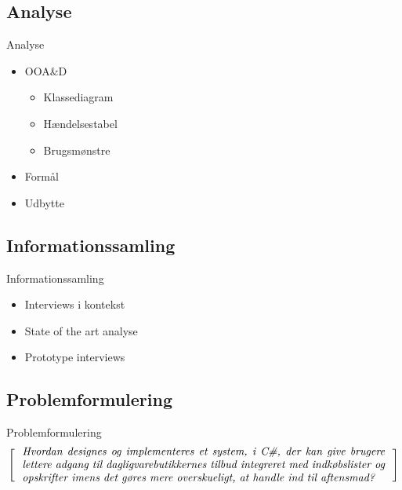 \subsection{Analyse}
\begin{frame}{Analyse}
\begin{itemize}
   \item OOA\&D
   \begin{itemize}
      \item Klassediagram
      \item Hændelsestabel
      \item Brugsmønstre
   \end{itemize}
   \item Formål %
   \item Udbytte %
\end{itemize}
\end{frame}

\subsection{Informationssamling}
\begin{frame}{Informationssamling}
\begin{itemize}
   \item Interviews i kontekst
   \item State of the art analyse
   \item Prototype interviews
\end{itemize}
\end{frame}

\subsection{Problemformulering}
\begin{frame}{Problemformulering}
\[
  \left[
  \begin{minipage}{\textwidth}
  \centering
  \begin{minipage}{0.96\textwidth}
  \textit{Hvordan designes og implementeres et system, i C\#, der kan give brugere lettere adgang til dagligvarebutikkernes tilbud integreret med indkøbslister og opskrifter imens det gøres mere overskueligt, at handle ind til aftensmad?}
  \end{minipage} 
  \end{minipage}                           
    \right]
\]
\end{frame}